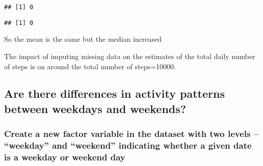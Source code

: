 \documentclass[]{article}
\newenvironment{Shaded}{\begin{snugshade}}{\end{snugshade}}
\newcommand{\KeywordTok}[1]{\textcolor[rgb]{0.13,0.29,0.53}{\textbf{#1}}}
\newcommand{\CommentTok}[1]{\textcolor[rgb]{0.56,0.35,0.01}{\textit{#1}}}
\newcommand{\OperatorTok}[1]{\textcolor[rgb]{0.81,0.36,0.00}{\textbf{#1}}}
\newcommand{\NormalTok}[1]{#1}
\begin{document}
\begin{Shaded}
\end{Shaded}

\begin{verbatim}
## [1] 0
\end{verbatim}

\begin{Shaded}
\end{Shaded}

\begin{verbatim}
## [1] 0
\end{verbatim}

So the mean is the same but the median increased

The impact of imputing missing data on the estimates of the total daily
number of steps is on around the total number of steps=10000.

\subsection{Are there differences in activity patterns between weekdays
and
weekends?}\label{are-there-differences-in-activity-patterns-between-weekdays-and-weekends}

\subsubsection{\texorpdfstring{Create a new factor variable in the
dataset with two levels -- ``weekday'' and ``weekend'' indicating
whether a given date is a weekday or weekend
day}{Create a new factor variable in the dataset with two levels -- weekday and weekend indicating whether a given date is a weekday or weekend day}}\label{create-a-new-factor-variable-in-the-dataset-with-two-levels-weekday-and-weekend-indicating-whether-a-given-date-is-a-weekday-or-weekend-day}
\end{document}
